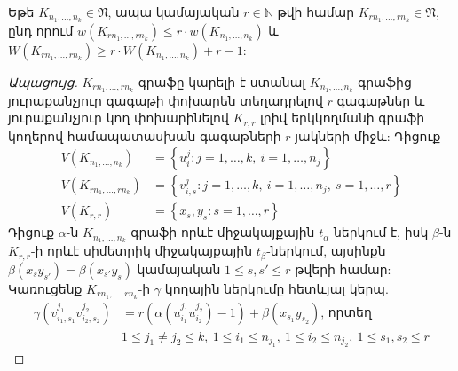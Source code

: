 \begin{hide}
\begin{lemma}
\label{l1-k-partite-scale}
Եթե $K_{n_1,\dots,n_k} \in \mathfrak{N}$, ապա կամայական $r \in \mathbb{N}$ թվի համար $K_{rn_1, \ldots, rn_k} \in \mathfrak{N}$, ընդ որում $w(K_{rn_1, \ldots, rn_k}) \leq r \cdot w(K_{n_1, \ldots, n_k})$ և $W(K_{rn_1, \ldots, rn_k}) \geq r \cdot W(K_{n_1, \ldots, n_k}) + r - 1$:
\end{lemma}
\begin{proof}[Ապացույց]
$K_{rn_1, \ldots, rn_k}$ գրաֆը կարելի է ստանալ $K_{n_1, \ldots, n_k}$ գրաֆից յուրաքանչյուր գագաթի փոխարեն տեղադրելով $r$ գագաթներ և յուրաքանչյուր կող փոխարինելով $K_{r,r}$ լրիվ երկկողմանի գրաֆի կողերով համապատասխան գագաթների $r$-յակների միջև: Դիցուք
\begin{align*}
    V(K_{n_1, \ldots, n_k}) &= \left\{u_i^j : j=1,\ldots,k,\ i=1,\ldots,n_j \right\} \\
    V(K_{rn_1, \ldots, rn_k}) &= \left\{v_{i,s}^j : j=1,\ldots,k,\ i=1,\ldots,n_j,\ s=1,\ldots,r \right\} \\
    V(K_{r,r}) &= \left\{x_s,y_s : s=1,\ldots,r\right\}
\end{align*}
Դիցուք $\alpha$-ն $K_{n_1, \ldots, n_k}$ գրաֆի որևէ միջակայքային $t_{\alpha}$ ներկում է, իսկ $\beta$-ն $K_{r,r}$-ի որևէ սիմետրիկ միջակայքային $t_{\beta}$-ներկում, այսինքն $\beta(x_sy_{s'})=\beta(x_{s'}y_{s})$ կամայական $1 \leq s, s' \leq r$ թվերի համար: Կառուցենք $K_{rn_1, \ldots, rn_k}$-ի $\gamma$ կողային ներկումը հետևյալ կերպ.
\begin{align}
    \gamma(v_{i_1,s_1}^{j_1}v_{i_2,s_2}^{j_2}) &= r(\alpha(u_{i_1}^{j_1}u_{i_2}^{j_2})-1) + \beta(x_{s_1}y_{s_2}) \text{, որտեղ }\\
    &1 \leq j_1 \ne j_2 \leq k,\ 1\leq i_1 \leq n_{j_1},\ 1 \leq i_2 \leq n_{j_2},\ 1\leq s_1, s_2 \leq r
\end{align}


\end{proof}
\end{hide}
